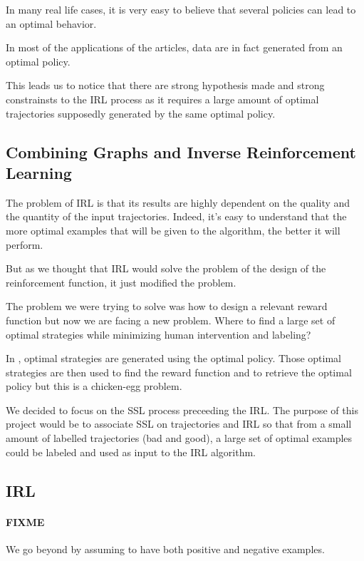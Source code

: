 \documentclass{article}
\begin{document}
In many real life cases, it is very easy to believe that several policies can lead to an optimal behavior.

In most of the applications of the articles, data are in fact generated from an optimal policy.

This leads us to notice that there are strong hypothesis made and strong constrainsts to the IRL process as it requires a large amount of optimal trajectories supposedly generated by the same optimal policy.

\subsection{Combining Graphs and Inverse Reinforcement Learning}

The problem of IRL is that its results are highly dependent on the quality and the quantity of the input trajectories. Indeed, it's easy to understand that the more optimal examples that will be given to the algorithm, the better it will perform.

But as we thought that IRL would solve the problem of the design of the reinforcement function, it just modified the problem.

The problem we were trying to solve was how to design a relevant reward function but now we are facing a new problem. Where to find a large set of optimal strategies while minimizing human intervention and labeling?

In \cite{Ng00}, optimal strategies are generated using the optimal policy. Those optimal strategies are then used to find the reward function and to retrieve the optimal policy but this is a chicken-egg problem.

We decided to focus on the SSL process preceeding the IRL. The purpose of this project would be to associate SSL on trajectories and IRL so that from a small amount of labelled trajectories (bad and good), a large set of optimal examples could be labeled and used as input to the IRL algorithm.


\subsection{IRL}

\paragraph{FIXME}
We go beyond by assuming to have both positive and negative examples.
\end{document}
